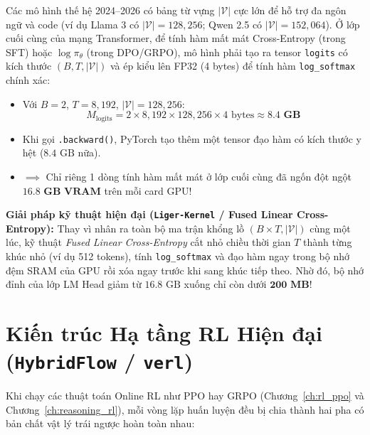 \begin{mathdecode}
Các mô hình thế hệ 2024--2026 có bảng từ vựng $|\mathcal{V}|$ cực lớn để hỗ trợ đa ngôn ngữ và code (ví dụ Llama 3 có $|\mathcal{V}| = 128{,}256$; Qwen 2.5 có $|\mathcal{V}| = 152{,}064$).
Ở lớp cuối cùng của mạng Transformer, để tính hàm mất mát Cross-Entropy (trong SFT) hoặc $\log \pi_\theta$ (trong DPO/GRPO), mô hình phải tạo ra tensor \texttt{logits} có kích thước $(B, T, |\mathcal{V}|)$ và ép kiểu lên FP32 (4 bytes) để tính hàm \texttt{log\_softmax} chính xác:
\begin{itemize}
  \item Với $B = 2$, $T = 8{,}192$, $|\mathcal{V}| = 128{,}256$:
  \begin{equation*}
    M_{\text{logits}} = 2 \times 8{,}192 \times 128{,}256 \times 4\text{ bytes} \approx \mathbf{8.4\text{ GB}}
  \end{equation*}
  \item Khi gọi \texttt{.backward()}, PyTorch tạo thêm một tensor đạo hàm có kích thước y hệt ($8.4\text{ GB}$ nữa).
  \item $\implies$ Chỉ riêng 1 dòng tính hàm mất mát ở lớp cuối cùng đã ngốn đột ngột $\mathbf{16.8\text{ GB VRAM}}$ trên mỗi card GPU!
\end{itemize}
\textbf{Giải pháp kỹ thuật hiện đại (\texttt{Liger-Kernel} / Fused Linear Cross-Entropy):} Thay vì nhân ra toàn bộ ma trận khổng lồ $(B \times T, |\mathcal{V}|)$ cùng một lúc, kỹ thuật \textit{Fused Linear Cross-Entropy} cắt nhỏ chiều thời gian $T$ thành từng khúc nhỏ (ví dụ 512 tokens), tính \texttt{log\_softmax} và đạo hàm ngay trong bộ nhớ đệm SRAM của GPU rồi xóa ngay trước khi sang khúc tiếp theo. Nhờ đó, bộ nhớ đỉnh của lớp LM Head giảm từ $16.8\text{ GB}$ xuống chỉ còn dưới $\mathbf{200\text{ MB}}$!
\end{mathdecode}

\section{Kiến trúc Hạ tầng RL Hiện đại (\texttt{HybridFlow} / \texttt{verl})}
\label{sec:hybridflow_verl}

Khi chạy các thuật toán Online RL như PPO hay GRPO (Chương~\ref{ch:rl_ppo} và Chương~\ref{ch:reasoning_rl}), mỗi vòng lặp huấn luyện đều bị chia thành hai pha có bản chất vật lý trái ngược hoàn toàn nhau:

